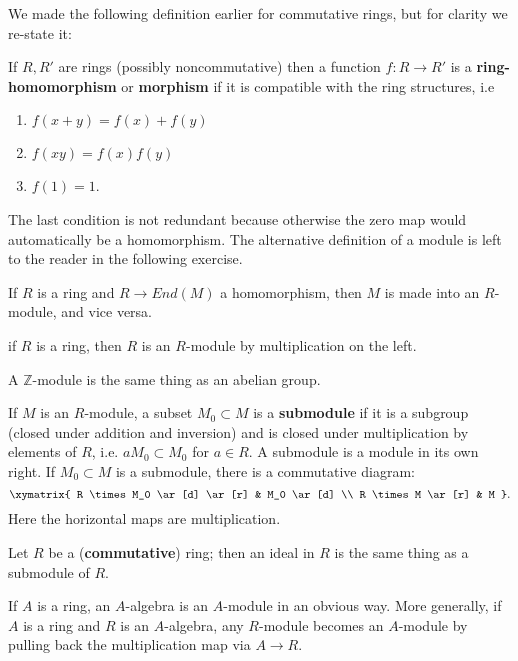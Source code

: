 We made the following definition earlier for commutative rings, but for
clarity we re-state it:
\begin{definition} 
If $R, R'$ are rings (possibly noncommutative) then a function $f: R \to R'$ is a
\textbf{ring-homomorphism}  or \textbf{morphism} if it is compatible with the
ring structures, i.e
\begin{enumerate}
\item  $f(x+y) = f(x) + f(y)$
\item $f(xy) = f(x)f(y)$
\item  $f(1) = 1$.
\end{enumerate}
\end{definition} 

The last condition is not redundant because otherwise the zero map would
automatically be a homomorphism.
The alternative definition of a module is left to the reader in the following
exercise.
\begin{exercise}
If $R$ is a ring and $R \to End(M)$ a homomorphism, then $M$ is made into an
$R$-module, and vice versa.  
\end{exercise}


\begin{example} 
if $R$ is a ring, then $R$ is an $R$-module by multiplication on the left. 
\end{example} 
\begin{example} 
A $\mathbb{Z}$-module is the same thing as an abelian group.
\end{example} 

\begin{definition} 
If $M$ is an $R$-module, a subset $M_0 \subset M$ is a \textbf{submodule} if it
is a subgroup (closed under addition and inversion) and is closed under
multiplication by elements of $R$, i.e. $aM_0 \subset M_0$ for $a \in R$. A
submodule is a module in its own right. If $M_0 \subset M$ is a submodule,
there is a commutative diagram:
\[ \xymatrix{
R \times M_0 \ar[d] \ar[r] &  M_0 \ar[d] \\ R \times M \ar[r] &  M
}.\]
Here the horizontal maps are multiplication.
\end{definition} 

\begin{example} 
Let $R$ be a (\textbf{commutative}) ring; then an ideal in $R$ is the same thing as a
submodule of $R$.
\end{example} 

\begin{example} 
If $A$ is a ring, an $A$-algebra is an $A$-module in an obvious way. More
generally, if $A$ is a ring and $R$ is an $A$-algebra, any $R$-module becomes
an $A$-module by pulling back the multiplication map via $A \to R$. 
\end{example} 



